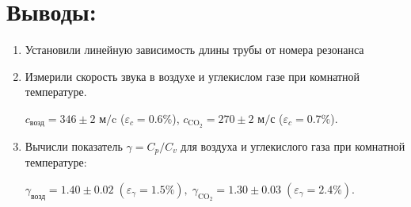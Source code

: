 \documentclass[a4paper,12pt]{article}
\begin{document}
\section{Выводы:}
\begin{enumerate}
\item
Установили линейную зависимость длины трубы от номера резонанса 
\item
Измерили скорость звука в воздухе и углекислом газе при комнатной температуре.

$c_{\text{возд}} = 346 \pm 2$ м$/$c ($\varepsilon_c = 0.6 \% $), $c_{\text{CO}_2} = 270 \pm 2$ м$/$с ($ \varepsilon_c = 0.7 \% $).

\item
Вычисли показатель $\gamma = C_p/C_v$ для воздуха и углекислого газа при комнатной температуре:

 $\gamma_{\text{возд}} = 1.40 \pm 0.02 \; (\varepsilon_\gamma = 1.5 \%), \; \gamma_{\text{CO}_2} = 1.30 \pm 0.03 \; (\varepsilon_\gamma = 2.4 \%)$.

\end{enumerate}
\end{document}
